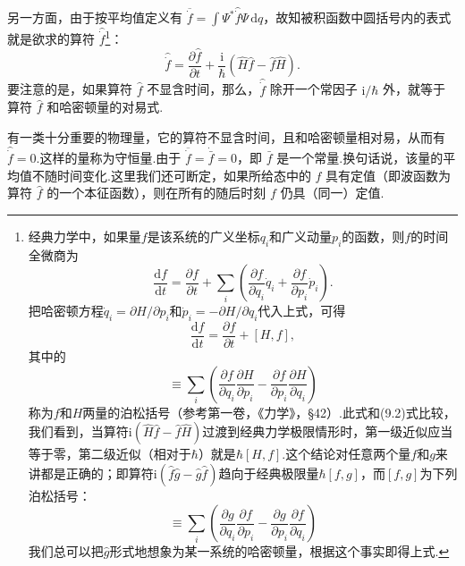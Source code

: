 另一方面，由于按平均值定义有 $\overline{\dot{f}}=\int\varPsi^{*}\hat{\dot{f}}\varPsi\,\mathrm{d}q$，故知被积函数中圆括号内的表式就是欲求的算符 $\hat{\dot{f}}$\footnote{经典力学中，如果量$f$是该系统的广义坐标$q_i$和广义动量$p_i$的函数，则$f$的时间全微商为
\begin{equation*}
  \frac{\mathrm{d}f}{\mathrm{d}t}=\frac{\partial f}{\partial t}
  +\sum_i\left(\frac{\partial f}{\partial q_i}\dot{q}_i
  +\frac{\partial f}{\partial p_i}\dot{p}_i\right).
\end{equation*}
把哈密顿方程$\dot{q}_i=\partial H/\partial p_i$和$\dot{p}_i=-\partial H/\partial q_i$代入上式，可得
\begin{equation*}
  \frac{\mathrm{d}f}{\mathrm{d}t}=\frac{\partial f}{\partial t}+[H,f],
\end{equation*}
其中的
\begin{equation*}
  [H,f]\equiv\sum_i\left(\frac{\partial f}{\partial q_i}
  \frac{\partial H}{\partial p_i}
  -\frac{\partial f}{\partial p_i}\frac{\partial H}{\partial q_i}\right)
\end{equation*}
称为$f$和$H$两量的泊松括号（参考第一卷，《力学》，§42）.此式和(9.2)式比较，我们看到，当算符$\mathrm{i}(\hat{H}\hat{f}-\hat{f}\hat{H})$过渡到经典力学极限情形时，第一级近似应当等于零，第二级近似（相对于$\hbar$）就是$\hbar[H,f]$.这个结论对任意两个量$f$和$g$来讲都是正确的；即算符$\mathrm{i}(\hat{f}\hat{g}-\hat{g}\hat{f})$趋向于经典极限量$\hbar[f,g]$，而$[f,g]$为下列泊松括号：
\begin{equation*}
  [f,g]\equiv\sum_i\left(\frac{\partial g}{\partial q_i}
  \frac{\partial f}{\partial p_i}
  -\frac{\partial g}{\partial p_i}\frac{\partial f}{\partial q_i}\right)
\end{equation*}
我们总可以把$\hat{g}$形式地想象为某一系统的哈密顿量，根据这个事实即得上式.}：
\begin{equation}
  \hat{\dot{f}}=\frac{\partial\hat{f}}{\partial t}
  +\frac{\mathrm{i}}{\hbar}(\hat{H}\hat{f}-\hat{f}\hat{H}).
\end{equation}
要注意的是，如果算符 $\hat{f}$ 不显含时间，那么，$\hat{\dot{f}}$ 除开一个常因子 $\mathrm{i}/\hbar$ 外，就等于算符 $\hat{f}$ 和哈密顿量的对易式.

有一类十分重要的物理量，它的算符不显含时间，且和哈密顿量相对易，从而有 $\hat{\dot{f}}=0$.这样的量称为守恒量.由于 $\overline{\dot{f}}=\dot{\bar{f}}=0$，即 $\bar{f}$ 是一个常量.换句话说，该量的平均值不随时间变化.这里我们还可断定，如果所给态中的 $f$ 具有定值（即波函数为算符 $\hat{f}$ 的一个本征函数），则在所有的随后时刻 $f$ 仍具（同一）定值.

